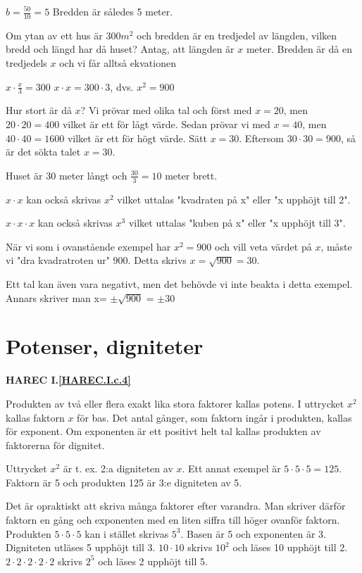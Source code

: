 \(b = \frac{50}{10} = 5\) Bredden är således 5 meter.

Om ytan av ett hus är \(300 m^2\) och bredden är en tredjedel av längden, vilken
bredd och längd har då huset?
Antag, att längden är \(x\) meter. Bredden är då en tredjedels \(x\) och vi får
alltså ekvationen

\(x \cdot \frac{x}{3} = 300\) \(x \cdot x = 300 \cdot 3\), dvs. \(x^2 = 900\)

Hur stort är då \(x\)?
Vi prövar med olika tal och först med \(x = 20\), men \(20 \cdot 20 = 400\) vilket
är ett för lågt värde. Sedan prövar vi med \(x = 40\), men \(40 \cdot 40 = 1600\)
vilket är ett för högt värde. Sätt \(x = 30\). Eftersom \(30 \cdot 30 = 900\), så är
det sökta talet \(x = 30\).

Huset är 30 meter långt och \(\frac{30}{3} = 10\) meter brett.

\(x \cdot x\) kan också skrivas \(x^2\) vilket uttalas "kvadraten på x" eller
"x upphöjt till 2".

\(x \cdot x \cdot x\) kan också skrivas \(x^3\) vilket uttalas "kuben på x" eller
"x upphöjt till 3".

När vi som i ovanstående exempel har \(x^2 = 900\) och vill veta värdet på \(x\),
måste vi "dra kvadratroten ur" \(900\).
Detta skrivs \(x = \sqrt{900} = 30\).

Ett tal kan även vara negativt, men det behövde vi inte beakta i detta exempel.
Annars skriver man x= \(\pm \sqrt{900}\) = \(\pm 30\)

\section{Potenser, digniteter}
\textbf{HAREC I.\ref{HAREC.I.c.4}\label{myHAREC.I.c.4}}

Produkten av två eller flera exakt lika stora faktorer kallas potens. I
uttrycket \(x^2\) kallas faktorn \(x\) för bas. Det antal gånger, som faktorn ingår
i produkten, kallas för exponent. Om exponenten är ett positivt helt tal
kallas produkten av faktorerna för dignitet.

Uttrycket \(x^2\) är t. ex. 2:a digniteten av \(x\).
Ett annat exempel är \(5 \cdot 5 \cdot 5 = 125\).
Faktorn är 5 och produkten 125 är 3:e digniteten av 5.

Det är opraktiskt att skriva många faktorer efter varandra. Man skriver därför
faktorn en gång och exponenten med en liten siffra till höger ovanför faktorn.
Produkten \(5 \cdot 5 \cdot 5\) kan i stället skrivas \(5^3\).
Basen är 5 och exponenten är 3. Digniteten utläses 5 upphöjt till 3.
\(10 \cdot 10\) skrivs \(10^2\) och läses 10 upphöjt till 2.
\(2 \cdot 2 \cdot 2 \cdot 2 \cdot 2\) skrivs \(2^5\) och läses 2 upphöjt
till 5.

